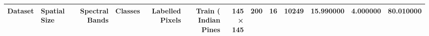 \begin{tabular}{llrrrrrr}
\toprule
Dataset & Spatial Size & Spectral Bands & Classes & Labelled Pixels & Train (%
\midrule
Indian Pines & 145 × 145 & 200 & 16 & 10249 & 15.990000 & 4.000000 & 80.010000 \\
\bottomrule
\end{tabular}
